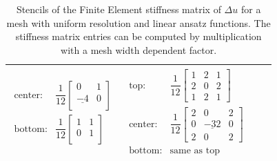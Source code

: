 \begin{table}
\begin{tabular}{|c|c|c|c}
\begin{minipage}{6cm}
\begin{equation*}
\begin{array}{ll}
        \text{center:} &
        \dfrac1{12}\left[\begin{array}{ccc}
            0 & 1\\
            \underline{-4} & 0\\
        \end{array}\right] \\[4mm]
        \text{bottom:}& 
        \dfrac1{12}\left[\begin{array}{ccc}
            1 & 1\\
            0 & 1\\
        \end{array}\right]
      \end{array}
    \end{equation*}
  \end{minipage} &
  \begin{minipage}{6cm}
    \begin{equation*}
      \begin{array}{ll}
        \text{top:} &
        \dfrac1{12}
        \left[\begin{array}{ccc}
            1 & 2 & 1\\
            2 & 0 & 2\\
            1 & 2 & 1
        \end{array}\right] \\[4mm]
        \text{center:} &
        \dfrac1{12}
        \left[\begin{array}{ccc}
            2 & 0 & 2\\
            0 & \underline{-32} & 0\\
            2 & 0 & 2
        \end{array}\right] \\[4mm]
        \text{bottom:}& \text{same as top}
      \end{array}  
    \end{equation*}
  \end{minipage}
  \\\hline
  \end{tabular}
  \caption{Stencils of the Finite Element stiffness matrix of $Δu$ for a mesh with uniform resolution and linear ansatz functions. The stiffness matrix entries can be computed by multiplication with a mesh width dependent factor.}
  \label{tab:stencils_laplace}
\end{table}

